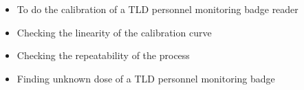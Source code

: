 \begin{itemize}
    \item To do the calibration of a TLD personnel monitoring badge reader
    \item Checking the linearity of the calibration curve
    \item Checking the repeatability of the process
    \item Finding unknown dose of a TLD personnel monitoring badge
\end{itemize}